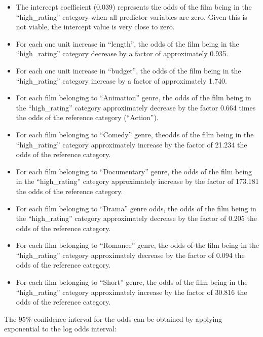 \documentclass[
  letterpaper,
  DIV=11,
  numbers=noendperiod]{scrartcl}
\begin{document}
\begin{itemize}
\item
  The intercept coefficient (0.039) represents the odds of the film
  being in the ``high\_rating'' category when all predictor variables
  are zero. Given this is not viable, the intercept value is very close
  to zero.
\item
  For each one unit increase in ``length'', the odds of the film being
  in the ``high\_rating'' category decrease by a factor of approximately
  0.935.
\item
  For each one unit increase in ``budget'', the odds of the film being
  in the ``high\_rating'' category increase by a factor of approximately
  1.740.
\item
  For each film belonging to ``Animation'' genre, the odds of the film
  being in the ``high\_rating'' category approximately decrease by the
  factor 0.664 times the odds of the reference category (``Action'').
\item
  For each film belonging to ``Comedy'' genre, theodds of the film being
  in the ``high\_rating'' category approximately increase by the factor
  of 21.234 the odds of the reference category.
\item
  For each film belonging to ``Documentary'' genre, the odds of the film
  being in the ``high\_rating'' category approximately increase by the
  factor of 173.181 the odds of the reference category.
\item
  For each film belonging to ``Drama'' genre odds, the odds of the film
  being in the ``high\_rating'' category approximately decrease by the
  factor of 0.205 the odds of the reference category.
\item
  For each film belonging to ``Romance'' genre, the odds of the film
  being in the ``high\_rating'' category approximately decrease by the
  factor of 0.094 the odds of the reference category.
\item
  For each film belonging to ``Short'' genre, the odds of the film being
  in the ``high\_rating'' category approximately increase by the factor
  of 30.816 the odds of the reference category.
\end{itemize}

The 95\% confidence interval for the odds can be obtained by applying
exponential to the log odds interval:
\end{document}
